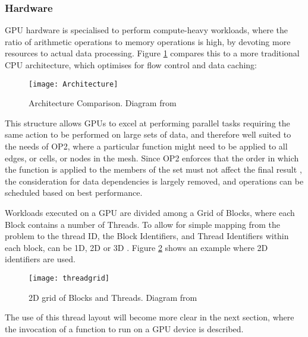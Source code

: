 \subsubsection{Hardware}
GPU hardware is specialised to perform compute-heavy workloads, where the ratio of arithmetic operations to memory operations is high, by devoting more resources to actual data processing. Figure \ref{fig:arch} compares this to a more traditional CPU architecture, which optimises for flow control and data caching:

\begin{figure}[h]
  \centering
  \texttt{[image: Architecture]}
  \caption{\label{fig:arch} Architecture Comparison. Diagram from \cite[p3]{guide}}
\end{figure}

This structure allows GPUs to excel at performing parallel tasks requiring the same action to be performed on large sets of data, and therefore well suited to the needs of OP2, where a particular function might need to be applied to all edges, or cells, or nodes in the mesh. Since OP2 enforces that the order in which the function is applied to the members of the set must not affect the final result \cite[p4]{manual}, the consideration for data dependencies is largely removed, and operations can be scheduled based on best performance.
\par
Workloads executed on a GPU are divided among a Grid of Blocks, where each Block contains a number of Threads. To allow for simple mapping from the problem to the thread ID, the Block Identifiers, and Thread Identifiers within each block, can be 1D, 2D or 3D \cite[p9]{guide}. Figure \ref{fig:threadgrid} shows an example where 2D identifiers are used.\\
\begin{figure}[h!]
  \centering
  \texttt{[image: threadgrid]}
  \caption{\label{fig:threadgrid} 2D grid of Blocks and Threads. Diagram from \cite[p9]{guide}}
\end{figure}

\noindent The use of this thread layout will become more clear in the next section, where the invocation of a function to run on a GPU device is described.

